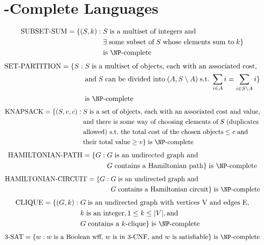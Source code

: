 \documentclass[a4paper]{report}
\newcommand{\bookref}[3]{\marginpar{\faBook{}~#1\\Chapter #2\\Section #3}}
\theoremstyle{definition}
\begin{document}
\section{\NP-Complete Languages}
\bookref{ER}{28}{28.6}
\vspace{-0.3cm}%
\begin{align*}
\text{SUBSET-SUM} = \{ (S, k) : & \;S \; \text{is a multiset of integers and}\\ & \; \exists \; \text{some subset of} \; S \; \text{whose elements sum to} \; k\}\\ & \;\text{is \NP-complete}
\end{align*}
%
\begin{align*}
\text{SET-PARTITION} = \{ S : &\; S \;\text{is a multiset of objects, each with an associated cost,}\\ & \; \text{and} \; S \; \text{can be divided into} \; (A, S \setminus A) \;\text{s.t.} \; \sum_{i\in A}i = \sum_{i\in S\setminus A}i \}\\ & \;\text{is \NP-complete}
\end{align*}
%
\begin{align*}
\text{KNAPSACK} = \{ (S, v, c) : &\; S \; \text{is a set of objects, each with an associated cost and value,}\\ & \;\text{and there is some way of choosing elements of} \;S \; \text{(duplicates}\\ & \; \text{allowed) s.t.~the total cost of the chosen objects} \leq c \; \text{and}\\ &\;\text{their total value} \geq v \} \;\text{is \NP-complete}
\end{align*}
%
\begin{align*}
\text{HAMILTONIAN-PATH} = \{ G : & \;G \;\text{is an undirected graph and}\\ &\; G \;\text{contains a Hamiltonian path}\} \;\text{is \NP-complete}
\end{align*}
%
\begin{align*}
\text{HAMILTONIAN-CIRCUIT} = \{ G : & \;G \;\text{is an undirected graph and}\\ &\; G \;\text{contains a Hamiltonian circuit}\} \;\text{is \NP-complete}
\end{align*}
%
\begin{align*}
\text{CLIQUE} = \{ (G, k) : &\; G \; \text{is an undirected graph with vertices V and edges E,}\\ & \; k \;\text{is an integer}, 1 \leq k \leq |V|, \text{and}\\ & \; G \; \text{contains a $k$-clique}\} \;\text{is \NP-complete}
\end{align*}
%
\begin{align*}
\text{3-SAT} = \{w : w \;\text{is a Boolean wff, $w$ is in 3-CNF, and $w$ is satisfiable}\} \;\text{is \NP-complete}
\end{align*}
\end{document}
